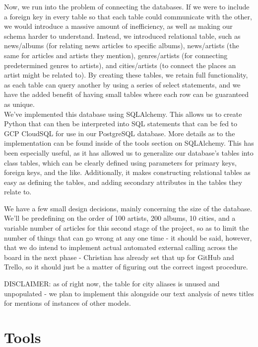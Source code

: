 \documentclass{scrartcl}
\begin{document}
    Now, we run into the problem of connecting the databases.
    If we were to include a foreign key in every table so that each table could communicate with the other, we would introduce a massive amount of inefficiency, as well as making our schema harder to understand.
    Instead, we introduced relational table, such as news/albums (for relating news articles to specific albums), news/artists (the same for articles and artists they mention), genres/artists (for connecting predetermined genres to artists), and cities/artists (to connect the places an artist might be related to).
    By creating these tables, we retain full functionality, as each table can query another by using a series of select statements, and we have the added benefit of having small tables where each row can be guaranteed as unique.\\

    We've implemented this database using SQLAlchemy.
    This allows us to create Python that can then be interpreted into SQL statements that can be fed to GCP CloudSQL for use in our PostgreSQL database.
    More details as to the implementation can be found inside of the tools section on SQLAlchemy.
    This has been especially useful, as it has allowed us to generalize our database's tables into class tables, which can be clearly defined using parameters for primary keys, foreign keys, and the like.
    Additionally, it makes constructing relational tables as easy as defining the tables, and adding secondary attributes in the tables they relate to.

    We have a few small design decisions, mainly concerning the size of the database.
    We'll be predefining on the order of 100 artists, 200 albums, 10 cities, and a variable number of articles for this second stage of the project, so as to limit the number of things that can go wrong at any one time - it should be said, however, that we do intend to implement actual automated external calling across the board in the next phase - Christian has already set that up for GitHub and Trello, so it should just be a matter of figuring out the correct ingest procedure.

    DISCLAIMER: as of right now, the table for city aliases is unused and unpopulated - we plan to implement this alongside our text analysis of news titles for mentions of instances of other models.

    \section{Tools}\label{sec:tools}
\end{document}
